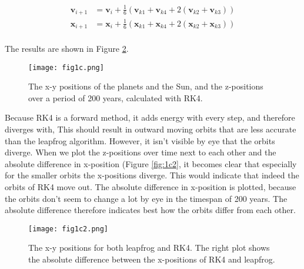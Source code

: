 \begin{align}
    \mathbf{v}_{i+1} &= \mathbf{v}_{i} + \frac{1}{6} (\mathbf{v}_{k1} + \mathbf{v}_{k4} + 2(\mathbf{v}_{k2} + \mathbf{v}_{k3})) \\
    \mathbf{x}_{i+1} &= \mathbf{x}_{i} + \frac{1}{6} (\mathbf{x}_{k1} + \mathbf{x}_{k4} + 2(\mathbf{x}_{k2} + \mathbf{x}_{k3})) \\
\end{align}

The results are shown in Figure \ref{fig:1c}.
\begin{figure}[h!]
  \centering
  \texttt{[image: fig1c.png]}
  \caption{The x-y positions of the planets and the Sun, and the z-positions over a period of 200 years, calculated with RK4.}
  \label{fig:1c}
\end{figure}

Because RK4 is a forward method, it adds energy with every step, and therefore diverges with, This should result in outward moving orbits that are less accurate than the leapfrog algorithm. However, it isn't visible by eye that the orbits diverge. When we plot the z-positions over time next to each other and the absolute difference in x-position (Figure \ref{fig:1c2}, it becomes clear that especially for the smaller orbits the x-positions diverge. This would indicate that indeed the orbits of RK4 move out. The absolute difference in x-position is plotted, because the orbits don't seem to change a lot by eye in the timespan of 200 years. The absolute difference therefore indicates best how the orbits differ from each other. 

\begin{figure}[h!]
  \centering
  \texttt{[image: fig1c2.png]}
  \caption{The x-y positions for both leapfrog and RK4. The right plot shows the absolute difference between the x-positions of RK4 and leapfrog.}
  \label{fig:1c}
\end{figure}
